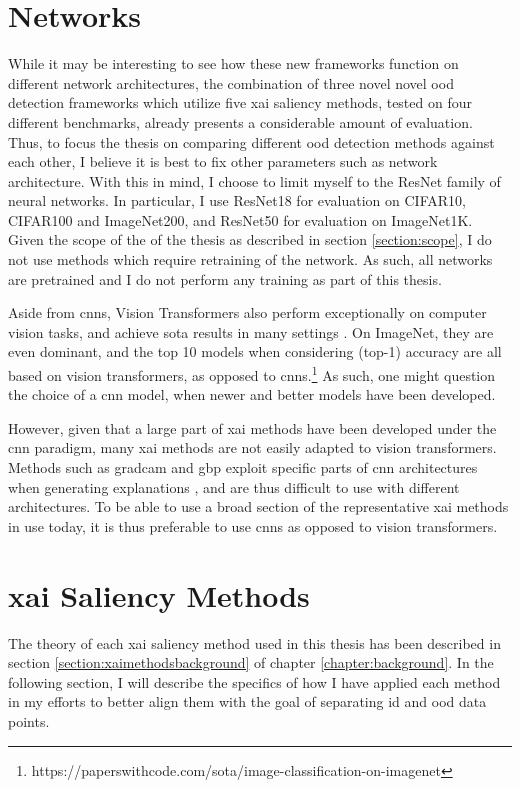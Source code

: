 \documentclass[UKenglish]{uiomasterthesis} %
\theoremstyle{definition}
\begin{document}
\section{Networks}

While it may be interesting to see how these new frameworks function on different network architectures, the combination of three novel novel \ac{ood} detection frameworks which utilize five \ac{xai} saliency methods, tested on four different benchmarks, already presents a considerable amount of evaluation. Thus, to focus the thesis on comparing different \ac{ood} detection methods against each other, I believe it is best to fix other parameters such as network architecture. With this in mind, I choose to limit myself to the ResNet \cite{resnet} family of neural networks. In particular, I use ResNet18 for evaluation on CIFAR10, CIFAR100 and ImageNet200, and ResNet50 for evaluation on ImageNet1K. Given the scope of the of the thesis as described in section \ref{section:scope}, I do not use methods which require retraining of the network. As such, all networks are pretrained and I do not perform any training as part of this thesis.

Aside from \acp{cnn}, Vision Transformers also perform exceptionally on computer vision tasks, and achieve \ac{sota} results in many settings \cite{vit}. On ImageNet, they are even dominant, and the top 10 models when considering (top-1) accuracy are all based on vision transformers, as opposed to \acp{cnn}.\footnote{https://paperswithcode.com/sota/image-classification-on-imagenet} As such, one might question the choice of a \ac{cnn} model, when newer and better models have been developed.

However, given that a large part of \ac{xai} methods have been developed under the \ac{cnn} paradigm, many \ac{xai} methods are not easily adapted to vision transformers. Methods such as \ac{gradcam} and \ac{gbp} exploit specific parts of \ac{cnn} architectures when generating explanations \cite{legrad}, and are thus difficult to use with different architectures. To be able to use a broad section of the representative \ac{xai} methods in use today, it is thus preferable to use \acp{cnn} as opposed to vision transformers.

\section{\ac{xai} Saliency Methods} \label{section:methodology_xai}

The theory of each \ac{xai} saliency method used in this thesis has been described in section \ref{section:xaimethodsbackground} of chapter \ref{chapter:background}. In the following section, I will describe the specifics of how I have applied each method in my efforts to better align them with the goal of separating \ac{id} and \ac{ood} data points.
\end{document}
